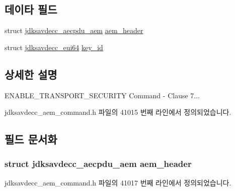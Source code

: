 \subsection*{데이타 필드}
\begin{DoxyCompactItemize}
\item 
struct \hyperlink{structjdksavdecc__aecpdu__aem}{jdksavdecc\+\_\+aecpdu\+\_\+aem} \hyperlink{structjdksavdecc__aem__command__enable__transport__security_ae1e77ccb75ff5021ad923221eab38294}{aem\+\_\+header}
\item 
struct \hyperlink{structjdksavdecc__eui64}{jdksavdecc\+\_\+eui64} \hyperlink{structjdksavdecc__aem__command__enable__transport__security_a37cbdf6056556ccfaee3ab01dc7c3032}{key\+\_\+id}
\end{DoxyCompactItemize}


\subsection{상세한 설명}
E\+N\+A\+B\+L\+E\+\_\+\+T\+R\+A\+N\+S\+P\+O\+R\+T\+\_\+\+S\+E\+C\+U\+R\+I\+TY Command -\/ Clause 7... 

jdksavdecc\+\_\+aem\+\_\+command.\+h 파일의 41015 번째 라인에서 정의되었습니다.



\subsection{필드 문서화}
\subsubsection[{\texorpdfstring{aem\+\_\+header}{aem_header}}]{\setlength{\rightskip}{0pt plus 5cm}struct {\bf jdksavdecc\+\_\+aecpdu\+\_\+aem} aem\+\_\+header}\hypertarget{structjdksavdecc__aem__command__enable__transport__security_ae1e77ccb75ff5021ad923221eab38294}{}\label{structjdksavdecc__aem__command__enable__transport__security_ae1e77ccb75ff5021ad923221eab38294}


jdksavdecc\+\_\+aem\+\_\+command.\+h 파일의 41017 번째 라인에서 정의되었습니다.

